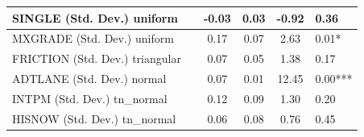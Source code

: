 \begin{table}
\begin{center}
\begin{tabular}{|l|l|c|c|c|l|}
			\hline
			SINGLE (Std. Dev.) uniform &  & -0.03 & 0.03 & -0.92 & 0.36 \\
			\hline
			MXGRADE (Std. Dev.) uniform &  & 0.17 & 0.07 & 2.63 & 0.01* \\
			\hline
			FRICTION (Std. Dev.) triangular &  & 0.07 & 0.05 & 1.38 & 0.17 \\
			\hline
			ADTLANE (Std. Dev.) normal &  & 0.07 & 0.01 & 12.45 & 0.00*** \\
			\hline
			INTPM (Std. Dev.) tn_normal &  & 0.12 & 0.09 & 1.30 & 0.20 \\
			\hline
			HISNOW (Std. Dev.) tn_normal &  & 0.06 & 0.08 & 0.76 & 0.45 \\
			\hline
		\end{tabular}
	\end{center}
\end{table}